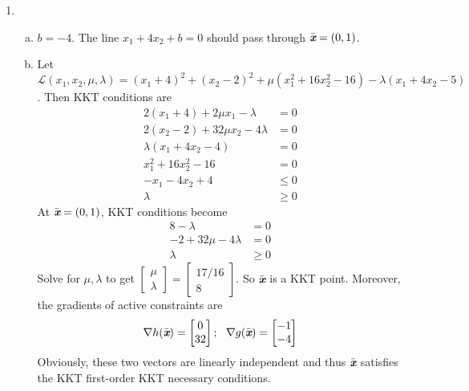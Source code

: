 \begin{enumerate}
	\item 
	\begin{enumerate}[(a)]
		\item $b = -4$. The line $x_1+4x_2+b=0$ should pass through $\bar{\textit{\textbf{x}}} = (0,1)$.
		
		\item Let $\mathcal{L}(x_1,x_2,\mu,\lambda) = (x_1+4)^2+(x_2-2)^2 + \mu(x_1^2+16x^2_2-16) - \lambda(x_1+4x_2-5)$. Then
		KKT conditions are
		\begin{align*}
		 2(x_1+4)+2\mu x_1-\lambda&= 0 \\
		 2(x_2-2)+32\mu x_2-4\lambda&=0\\
		\lambda (x_1+4x_2-4) &= 0\\
		x_1^2+16x_2^2-16&=0\\
		-x_1-4x_2+4&\le 0\\
		\lambda &\ge 0		 			 
		\end{align*}
		At $\bar{\textit{\textbf{x}}} = (0,1)$, KKT conditions become
		\begin{align*}
		8-\lambda&= 0 \\
		-2+32\mu-4\lambda&=0\\
		\lambda &\ge 0	
		\end{align*}
		Solve for $\mu,\lambda$ to get $\begin{bmatrix}
		\mu\\\lambda
		\end{bmatrix} = \begin{bmatrix}
		 17/16\\8
		\end{bmatrix}$. So $\bar{\textit{\textbf{x}}}$ is a KKT point. Moreover, the gradients of active constraints are
		\[
		\nabla h(\bar{\textit{\textbf{x}}}) = \begin{bmatrix}
		0\\32
		\end{bmatrix};~~\nabla g(\bar{\textit{\textbf{x}}}) =\begin{bmatrix}
		-1 \\ -4
		\end{bmatrix}
		\]
		Obviously, these two vectors are linearly independent and thus $\bar{\textit{\textbf{x}}}$ satisfies the KKT first-order KKT necessary conditions.
	\end{enumerate}
	

\end{enumerate}
